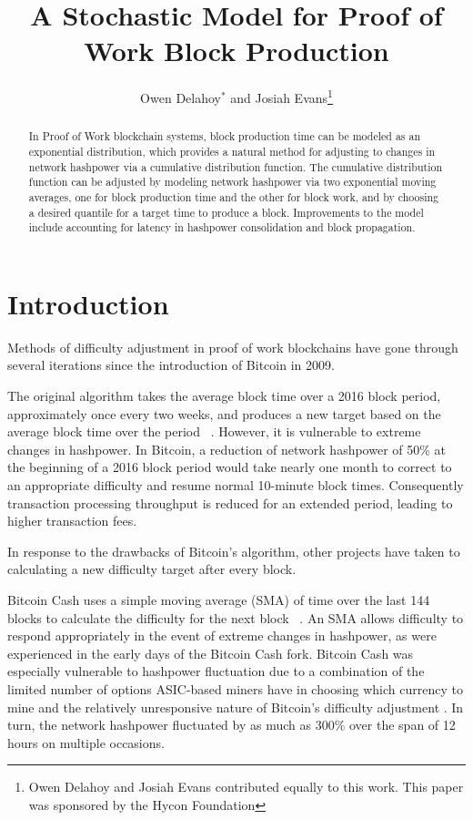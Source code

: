 \documentclass[]{article}
\title{A Stochastic Model for Proof of Work Block Production}
\author{Owen Delahoy$^*$ and Josiah Evans\footnote{Owen Delahoy and Josiah Evans contributed equally to this work. This paper was sponsored by the Hycon Foundation}}
\begin{document}
\maketitle


\begin{abstract}
In Proof of Work blockchain systems, block production time can be modeled as an exponential distribution, which provides a natural method for adjusting to changes in network hashpower via a cumulative distribution function.  The cumulative distribution function can be adjusted by modeling network hashpower via two exponential moving averages, one for block production time and the other for block work, and by choosing a desired quantile for a target time to produce a block.  Improvements to the model include accounting for latency in hashpower consolidation and block propagation.     
\end{abstract}

\section{Introduction}
Methods of difficulty adjustment in proof of work blockchains have gone through several iterations since the introduction of Bitcoin in 2009.  
\newline

The original algorithm takes the average block time over a 2016 block period, approximately once every two weeks, and produces a new target based on the average block time over the period ~\cite{BitcoinRetarget}.  However, it is vulnerable to extreme changes in hashpower.  In Bitcoin, a reduction of network hashpower of 50\% at the beginning of a 2016 block period would take nearly one month to correct to an appropriate difficulty and resume normal 10-minute block times.  Consequently transaction processing throughput is reduced for an extended period, leading to higher transaction fees.   
\newline

In response to the drawbacks of Bitcoin's algorithm, other projects have taken to calculating a new difficulty target after every block.   
\newline

Bitcoin Cash uses a simple moving average (SMA) of time over the last 144 blocks to calculate the difficulty for the next block ~\cite{Bitcoin-ABC}.  An SMA allows difficulty to respond appropriately in the event of extreme changes in hashpower, as were experienced in the early days of the Bitcoin Cash fork.  Bitcoin Cash was especially vulnerable to hashpower fluctuation due to a combination of the limited number of options ASIC-based miners have in choosing which currency to mine and the relatively unresponsive nature of Bitcoin's difficulty adjustment \cite{BitcoinCashMining}.  In turn, the network hashpower fluctuated by as much as 300\% \cite{BitcoinCashDifficulty} over the span of 12 hours on multiple occasions.   
\newline
\end{document}

